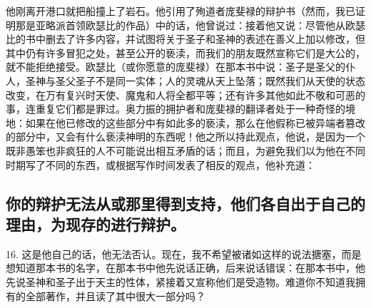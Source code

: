 他刚离开港口就把船撞上了岩石。他引用了殉道者庞斐禄的辩护书（然而，我已证明那是亚略派首领欧瑟比的作品）中的话，他曾说过：接着他又说：尽管他从欧瑟比的书中删去了许多内容，并试图将关于圣子和圣神的表述在善义上加以修改，但其中仍有许多冒犯之处，甚至公开的亵渎，而我们的朋友既然宣称它们是大公的，就不能拒绝接受。欧瑟比（或你愿意的庞斐禄）在那本书中说：圣子是圣父的仆人，圣神与圣父圣子不是同一实体；人的灵魂从天上坠落；既然我们从天使的状态改变，在万有复兴时天使、魔鬼和人将全都平等；还有许多其他如此不敬和可恶的事，连重复它们都是罪过。奥力振的拥护者和庞斐禄的翻译者处于一种奇怪的境地：如果在他已修改的这些部分中有如此多的亵渎，那么在他假称已被异端者篡改的部分中，又会有什么亵渎神明的东西呢！他之所以持此观点，他说，是因为一个既非愚笨也非疯狂的人不可能说出相互矛盾的话；而且，为避免我们以为他在不同时期写了不同的东西，或根据写作时间发表了相反的观点，他补充道：\par

\par


\subsection{你的辩护无法从或那里得到支持，他们各自出于自己的理由，为现存的进行辩护。}

16. 这是他自己的话，他无法否认。现在，我不希望被诸如这样的说法搪塞，而是想知道那本书的名字，在那本书中他先说话正确，后来说话错误：在那本书中，他先说圣神和圣子出于天主的性体，紧接着又宣称他们是受造物。难道你不知道我拥有的全部著作，并且读了其中很大一部分吗？\par

